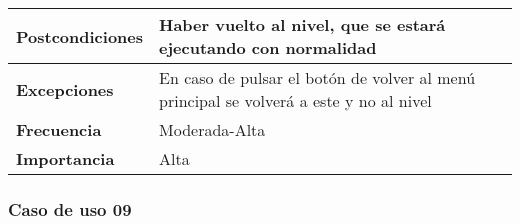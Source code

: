 \begin{tabularx}{\columnwidth}{l|l}
\begin{minipage}{0.25\columnwidth}
\textbf{Postcondiciones} 
\end{minipage}
&
\begin{minipage}{0.65\columnwidth}
Haber vuelto al nivel, que se estará ejecutando con normalidad
\end{minipage}
\\ \hline

\begin{minipage}{0.25\columnwidth}
\textbf{Excepciones} 
\end{minipage}
&
\begin{minipage}{0.65\columnwidth}
En caso de pulsar el botón de volver al menú principal se volverá a este y no al nivel
\end{minipage}
\\ \hline

\begin{minipage}{0.25\columnwidth}
\textbf{Frecuencia} 
\end{minipage}
&
\begin{minipage}{0.65\columnwidth}
Moderada-Alta
\end{minipage}
\\ \hline

\begin{minipage}{0.25\columnwidth}
\textbf{Importancia} 
\end{minipage}
&
\begin{minipage}{0.65\columnwidth}
Alta
\end{minipage}
\\ \hline
\end{tabularx}

\subsubsection{Caso de uso 09}

